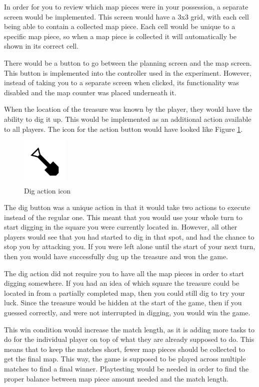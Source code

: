 In order for you to review which map pieces were in your possession, a separate screen would be implemented. This screen would have a 3x3 grid, with each cell being able to contain a collected map piece. Each cell would be unique to a specific map piece, so when a map piece is collected it will automatically be shown in its correct cell.

There would be a button to go between the planning screen and the map screen. This button is implemented into the controller used in the experiment. However, instead of taking you to a separate screen when clicked, its functionality was disabled and the map counter was placed underneath it.

When the location of the treasure was known by the player, they would have the ability to dig it up. This would be implemented as an additional action available to all players. The icon for the action button would have looked like Figure \ref{fig:dig}.

\begin{figure}[h!]
	\centering
	\includegraphics[width=0.2\textwidth]{figures/dig.png}
	\caption{Dig action icon \label{fig:dig}}
\end{figure}

The dig button was a unique action in that it would take two actions to execute instead of the regular one. This meant that you would use your whole turn to start digging in the square you were currently located in. However, all other players would see that you had started to dig in that spot, and had the chance to stop you by attacking you. If you were left alone until the start of your next turn, then you would have successfully dug up the treasure and won the game. 

The dig action did not require you to have all the map pieces in order to start digging somewhere. If you had an idea of which square the treasure could be located in from a partially completed map, then you could still dig to try your luck. Since the treasure would be hidden at the start of the game, then if you guessed correctly, and were not interrupted in digging, you would win the game.

This win condition would increase the match length, as it is adding more tasks to do for the individual player on top of what they are already supposed to do. This means that to keep the matches short, fewer map pieces should be collected to get the final map. This way, the game is supposed to be played across multiple matches to find a final winner. Playtesting would be needed in order to find the proper balance between map piece amount needed and the match length.

